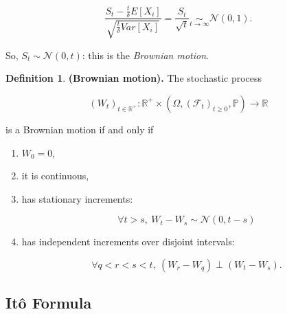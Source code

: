 \documentclass[twoside,openright,titlepage,headinclude,12pt,a4paper,BCOR5mm,footinclude]{book}
\theoremstyle{definition}
\newtheorem{defn}{Definition}
\begin{document}
  \[
    \frac{S_t - \frac{t}{\delta} E[X_i]}{\sqrt{\frac{t}{\delta} Var[X_i]}}
    = \frac{S_t}{\sqrt{t}} \underset{t \to \infty}{\sim} \mathcal{N}(0,1).
  \]

  So, $S_t \sim \mathcal{N}(0,t)$: this is the \textit{Brownian motion}.

  \begin{defn} 
    \textbf{(Brownian motion).} The stochastic process 

    \[
      (W_t)_{t\in\mathbb{R}^+} : \mathbb{R}^+ \times (\Omega, (\mathcal{F}_t)_{t \geq 0}, \mathbb{P}) \to \mathbb{R}
    \]

    is a Brownian motion if and only if

    \begin{enumerate}
      \item $W_0 = 0$,
      \item it is continuous,
      \item has stationary increments: 
        
        $$\forall t > s,\ W_t - W_s \sim \mathcal{N}(0,t-s)$$

      \item has independent increments over disjoint intervals: 
        
        $$\forall q < r < s < t,\ (W_r-W_q) \perp (W_t-W_s).$$
    \end{enumerate}
  \end{defn}


  \subsection{It\^o Formula}
\end{document}
